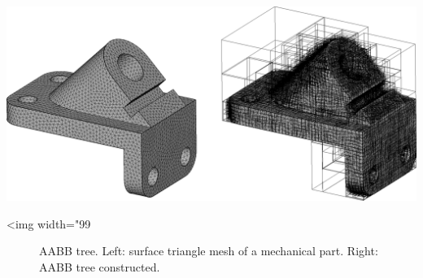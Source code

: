 \begin{center}
    \label{fig:AABB-tree-anchor}
    \begin{ccTexOnly}
      \includegraphics[width=1.0\textwidth]{AABB_tree/figs/anchor}
    \end{ccTexOnly}
    \begin{ccHtmlOnly}
        <img width="99%
    \end{ccHtmlOnly}
    \begin{figure}[h]
        \caption{AABB tree.
                 Left: surface triangle mesh of a mechanical part.
                 Right: AABB tree constructed.}
    \end{figure}
\end{center}
